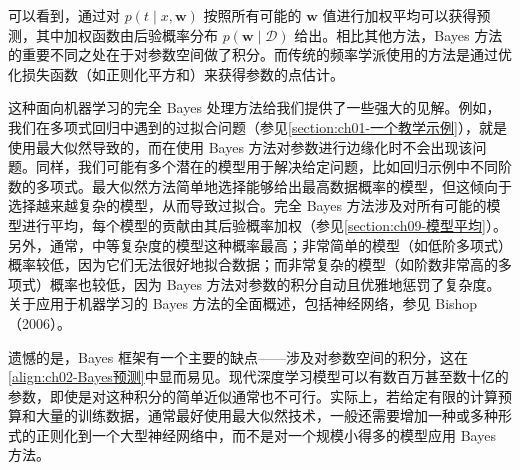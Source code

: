 \documentclass[../../main.tex]{subfiles}
\begin{document}
可以看到，通过对 $p(t\mid x,\mathbf{w})$ 按照所有可能的 $\mathbf{w}$ 值进行加权平均可以获得预测，其中加权函数由后验概率分布 $p(\mathbf{w}\mid\mathcal{D})$ 给出。相比其他方法，Bayes 方法的重要不同之处在于对参数空间做了积分。而传统的频率学派使用的方法是通过优化损失函数（如正则化平方和）来获得参数的点估计。

这种面向机器学习的完全 Bayes 处理方法给我们提供了一些强大的见解。例如，我们在多项式回归中遇到的过拟合问题（参见\cref{section:ch01-一个教学示例}），就是使用最大似然导致的，而在使用 Bayes 方法对参数进行边缘化时不会出现该问题。同样，我们可能有多个潜在的模型用于解决给定问题，比如回归示例中不同阶数的多项式。最大似然方法简单地选择能够给出最高数据概率的模型，但这倾向于选择越来越复杂的模型，从而导致过拟合。完全 Bayes 方法涉及对所有可能的模型进行平均，每个模型的贡献由其后验概率加权（参见\cref{section:ch09-模型平均}）。另外，通常，中等复杂度的模型这种概率最高；非常简单的模型（如低阶多项式）概率较低，因为它们无法很好地拟合数据；而非常复杂的模型（如阶数非常高的多项式）概率也较低，因为 Bayes 方法对参数的积分自动且优雅地惩罚了复杂度。关于应用于机器学习的 Bayes 方法的全面概述，包括神经网络，参见 Bishop（2006）。

遗憾的是，Bayes 框架有一个主要的缺点——涉及对参数空间的积分，这在\eqref{align:ch02-Bayes预测}中显而易见。现代深度学习模型可以有数百万甚至数十亿的参数，即使是对这种积分的简单近似通常也不可行。实际上，若给定有限的计算预算和大量的训练数据，通常最好使用最大似然技术，一般还需要增加一种或多种形式的正则化到一个大型神经网络中，而不是对一个规模小得多的模型应用 Bayes 方法。
\end{document}
